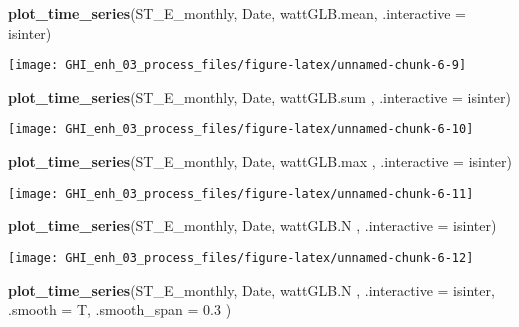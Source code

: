 \documentclass[
  10pt,
  a4paper,oneside]{article}
\newenvironment{Shaded}{\begin{snugshade}}{\end{snugshade}}
\newcommand{\AttributeTok}[1]{\textcolor[rgb]{0.13,0.29,0.53}{#1}}
\newcommand{\FloatTok}[1]{\textcolor[rgb]{0.00,0.00,0.81}{#1}}
\newcommand{\FunctionTok}[1]{\textcolor[rgb]{0.13,0.29,0.53}{\textbf{#1}}}
\newcommand{\NormalTok}[1]{#1}
\begin{document}
\begin{Shaded}
\begin{Highlighting}[]
\FunctionTok{plot\_time\_series}\NormalTok{(ST\_E\_monthly, Date, wattGLB.mean, }\AttributeTok{.interactive =}\NormalTok{ isinter)}
\end{Highlighting}
\end{Shaded}

\begin{center}\texttt{[image: GHI\_enh\_03\_process\_files/figure-latex/unnamed-chunk-6-9]} \end{center}

\begin{Shaded}
\begin{Highlighting}[]
\FunctionTok{plot\_time\_series}\NormalTok{(ST\_E\_monthly, Date, wattGLB.sum , }\AttributeTok{.interactive =}\NormalTok{ isinter)}
\end{Highlighting}
\end{Shaded}

\begin{center}\texttt{[image: GHI\_enh\_03\_process\_files/figure-latex/unnamed-chunk-6-10]} \end{center}

\begin{Shaded}
\begin{Highlighting}[]
\FunctionTok{plot\_time\_series}\NormalTok{(ST\_E\_monthly, Date, wattGLB.max , }\AttributeTok{.interactive =}\NormalTok{ isinter)}
\end{Highlighting}
\end{Shaded}

\begin{center}\texttt{[image: GHI\_enh\_03\_process\_files/figure-latex/unnamed-chunk-6-11]} \end{center}

\begin{Shaded}
\begin{Highlighting}[]
\FunctionTok{plot\_time\_series}\NormalTok{(ST\_E\_monthly, Date, wattGLB.N   , }\AttributeTok{.interactive =}\NormalTok{ isinter)}
\end{Highlighting}
\end{Shaded}

\begin{center}\texttt{[image: GHI\_enh\_03\_process\_files/figure-latex/unnamed-chunk-6-12]} \end{center}

\begin{Shaded}
\begin{Highlighting}[]
\FunctionTok{plot\_time\_series}\NormalTok{(ST\_E\_monthly, Date, wattGLB.N   , }\AttributeTok{.interactive =}\NormalTok{ isinter, }\AttributeTok{.smooth =}\NormalTok{ T, }\AttributeTok{.smooth\_span =} \FloatTok{0.3}\NormalTok{ )}
\end{Highlighting}
\end{Shaded}
\end{document}
